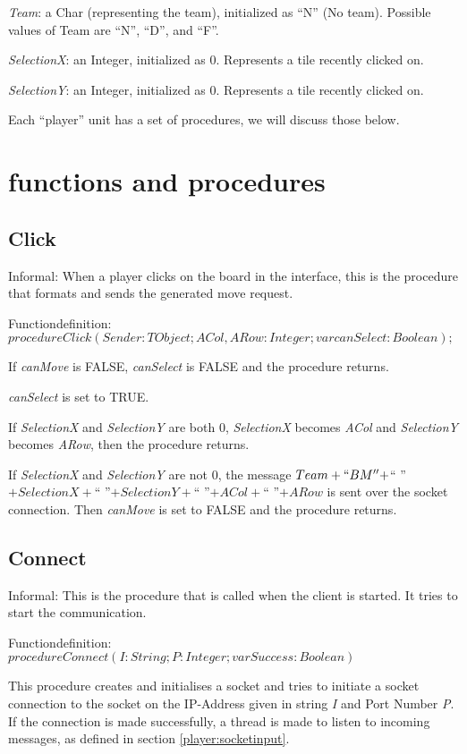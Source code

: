 \documentclass[a4paper,twoside,11pt]{book}
\begin{document}
\emph{Team}: a Char (representing the team), initialized as ``N'' (No team). Possible values of Team are ``N'', ``D'', and ``F''.

\emph{SelectionX}: an Integer, initialized as 0. Represents a tile recently clicked on.

\emph{SelectionY}: an Integer, initialized as 0. Represents a tile recently clicked on.

Each ``player'' unit has a set of procedures, we will discuss those below.

\section{functions and procedures}

\subsection{Click}
Informal: When a player clicks on the board in the interface, this is the procedure that formats and sends the generated move request.

Functiondefinition: $procedure Click(Sender: TObject; ACol, ARow: Integer; var  canSelect: Boolean);$

If \emph{canMove} is FALSE, \emph{canSelect} is FALSE and the procedure returns.

\emph{canSelect} is set to TRUE.

If \emph{SelectionX} and \emph{SelectionY} are both 0, \emph{SelectionX} becomes \emph{ACol} and \emph{SelectionY} becomes \emph{ARow}, then the procedure returns.

If \emph{SelectionX} and \emph{SelectionY} are not 0, the message $Team + ``BM'' + $`` ''$ + SelectionX + $`` ''$ + SelectionY + $`` ''$ + ACol + $`` ''$ + ARow$ is sent over the socket connection. Then \emph{canMove} is set to FALSE and the procedure returns.

\subsection{Connect}
Informal: This is the procedure that is called when the client is started. It tries to start the communication.

Functiondefinition: $procedure Connect(I: String; P: Integer; var Success: Boolean)$

This procedure creates and initialises a socket and tries to initiate a socket connection to the socket on the IP-Address given in string \emph{I} and Port Number \emph{P}. If the connection is made successfully, a thread is made to listen to incoming messages, as defined in section \ref{player:socketinput}.
\end{document}
